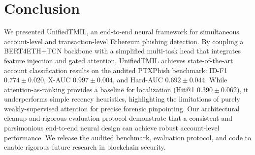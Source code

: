 \documentclass[conference]{IEEEtran}
\begin{document}
\section{Conclusion}
We presented UnifiedTMIL, an end-to-end neural framework for simultaneous account-level and transaction-level Ethereum phishing detection. By coupling a BERT4ETH+TCN backbone with a simplified multi-task head that integrates feature injection and gated attention, UnifiedTMIL achieves state-of-the-art account classification results on the audited PTXPhish benchmark: ID-F1 $0.774\pm0.020$, X-AUC $0.997\pm0.004$, and Hard-AUC $0.692\pm0.044$. While attention-as-ranking provides a baseline for localization (Hit@1 $0.390\pm0.062$), it underperforms simple recency heuristics, highlighting the limitations of purely weakly-supervised attention for precise forensic pinpointing. Our architectural cleanup and rigorous evaluation protocol demonstrate that a consistent and parsimonious end-to-end neural design can achieve robust account-level performance. We release the audited benchmark, evaluation protocol, and code to enable rigorous future research in blockchain security.
\end{document}
